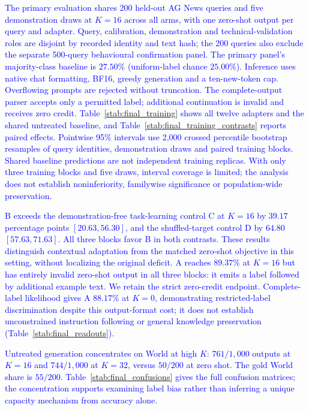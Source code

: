 \textcolor{blue}{The primary evaluation shares 200 held-out AG News queries and five demonstration
draws at $K=16$ across all arms, with one zero-shot output per query and adapter.
Query, calibration, demonstration and technical-validation roles are disjoint by
recorded identity and text hash; the 200 queries also exclude the separate 500-query
behavioural confirmation panel. The primary panel's majority-class baseline is
$27.50\%$ (uniform-label chance $25.00\%$). Inference uses native chat formatting, BF16, greedy
generation and a ten-new-token cap. Overflowing prompts are rejected without
truncation. The complete-output parser accepts only a permitted label; additional
continuation is invalid and receives zero credit. Table~\ref{stab:final_training}
shows all twelve adapters and the shared untreated baseline, and
Table~\ref{stab:final_training_contrasts} reports paired effects. Pointwise 95\%
intervals use 2,000 crossed percentile bootstrap resamples of query identities,
demonstration draws and paired training blocks. Shared baseline predictions are not
independent training replicas. With only three training blocks and five draws,
interval coverage is limited; the analysis does not establish noninferiority,
familywise significance or population-wide preservation.}

\textcolor{blue}{B exceeds the demonstration-free task-learning control C at $K=16$ by
$39.17$ percentage points $[20.63,56.30]$, and the shuffled-target control D by
$64.80$ $[57.63,71.63]$. All three blocks favor B in both contrasts.
These results distinguish contextual adaptation from the matched zero-shot objective
in this setting, without localizing the original deficit. A reaches $89.37\%$ at
$K=16$ but has entirely invalid zero-shot output in all three blocks: it emits a
label followed by additional example text. We retain the strict zero-credit endpoint.
Complete-label likelihood gives A $88.17\%$ at $K=0$, demonstrating restricted-label
discrimination despite this output-format cost; it does not establish unconstrained
instruction following or general knowledge preservation (Table~\ref{stab:final_readouts}).}

\textcolor{blue}{Untreated generation concentrates on World at high $K$: $761/1,000$ outputs
at $K=16$ and $744/1,000$ at $K=32$, versus $50/200$ at zero shot. The gold World
share is $55/200$. Table~\ref{stab:final_confusions} gives the full confusion matrices;
the concentration supports examining label bias rather than inferring a unique
capacity mechanism from accuracy alone.}

